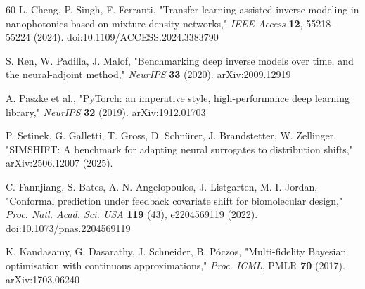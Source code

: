 \documentclass[11pt,a4paper]{article}
\begin{document}
\begin{thebibliography}{60}
L. Cheng, P. Singh, F. Ferranti, "Transfer learning-assisted inverse modeling in nanophotonics based on mixture density networks," \emph{IEEE Access} \textbf{12}, 55218--55224 (2024). doi:10.1109/ACCESS.2024.3383790

S. Ren, W. Padilla, J. Malof, "Benchmarking deep inverse models over time, and the neural-adjoint method," \emph{NeurIPS} \textbf{33} (2020). arXiv:2009.12919

A. Paszke et al., "PyTorch: an imperative style, high-performance deep learning library," \emph{NeurIPS} \textbf{32} (2019). arXiv:1912.01703

P. Setinek, G. Galletti, T. Gross, D. Schnürer, J. Brandstetter, W. Zellinger, "SIMSHIFT: A benchmark for adapting neural surrogates to distribution shifts," arXiv:2506.12007 (2025).

C. Fannjiang, S. Bates, A. N. Angelopoulos, J. Listgarten, M. I. Jordan, "Conformal prediction under feedback covariate shift for biomolecular design," \emph{Proc. Natl. Acad. Sci. USA} \textbf{119} (43), e2204569119 (2022). doi:10.1073/pnas.2204569119

K. Kandasamy, G. Dasarathy, J. Schneider, B. Póczos, "Multi-fidelity Bayesian optimisation with continuous approximations," \emph{Proc. ICML}, PMLR \textbf{70} (2017). arXiv:1703.06240
\end{thebibliography}
\end{document}
